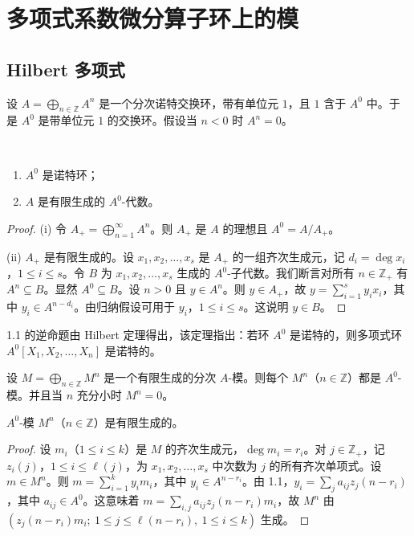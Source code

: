 \chapter{多项式系数微分算子环上的模}

\section{Hilbert 多项式}

设 $A=\bigoplus_{n\in\mathbb{Z}} A^n$ 是一个分次诺特交换环，带有单位元 $1$，且 $1$ 含于 $A^0$ 中。于是 $A^0$ 是带单位元 $1$ 的交换环。假设当 $n<0$ 时 $A^n=0$。

\begin{lemma}\ 
\begin{enumerate}[label=(\roman*)]
  \item $A^0$ 是诺特环；
  \item $A$ 是有限生成的 $A^0$-代数。
\end{enumerate}
\end{lemma}

\begin{proof}
(i) 令 $A_+=\bigoplus_{n=1}^{\infty}A^n$。则 $A_+$ 是 $A$ 的理想且 $A^0=A/A_+$。

(ii) $A_+$ 是有限生成的。设 $x_1,x_2,\dots,x_s$ 是 $A_+$ 的一组齐次生成元，记 $d_i=\deg x_i$，$1\le i\le s$。令 $B$ 为 $x_1,x_2,\dots,x_s$ 生成的 $A^0$-子代数。我们断言对所有 $n\in\mathbb{Z}_+$ 有 $A^n\subseteq B$。显然 $A^0\subseteq B$。设 $n>0$ 且 $y\in A^n$。则 $y\in A_+$，故 $y=\sum_{i=1}^s y_i x_i$，其中 $y_i\in A^{n-d_i}$。由归纳假设可用于 $y_i$，$1\le i\le s$。这说明 $y\in B$。
\end{proof}

1.1 的逆命题由 Hilbert 定理得出，该定理指出：若环 $A^0$ 是诺特的，则多项式环 $A^0[X_1,X_2,\dots,X_n]$ 是诺特的。

设 $M=\bigoplus_{n\in\mathbb{Z}} M^n$ 是一个有限生成的分次 $A$-模。则每个 $M^n$（$n\in\mathbb{Z}$）都是 $A^0$-模。并且当 $n$ 充分小时 $M^n=0$。

\begin{lemma}
$A^0$-模 $M^n$（$n\in\mathbb{Z}$）是有限生成的。
\end{lemma}

\begin{proof}
设 $m_i$（$1\le i\le k$）是 $M$ 的齐次生成元，$\deg m_i=r_i$。对 $j\in\mathbb{Z}_+$，记 $z_i(j)$，$1\le i\le \ell(j)$，为 $x_1,x_2,\dots,x_s$ 中次数为 $j$ 的所有齐次单项式。设 $m\in M^n$。则 $m=\sum_{i=1}^k y_i m_i$，其中 $y_i\in A^{n-r_i}$。由 1.1，$y_i=\sum_j a_{ij} z_j(n-r_i)$，其中 $a_{ij}\in A^0$。这意味着 $m=\sum_{i,j}a_{ij}z_j(n-r_i)m_i$，故 $M^n$ 由 $(z_j(n-r_i)m_i;\ 1\le j\le \ell(n-r_i),\ 1\le i\le k)$ 生成。
\end{proof}

